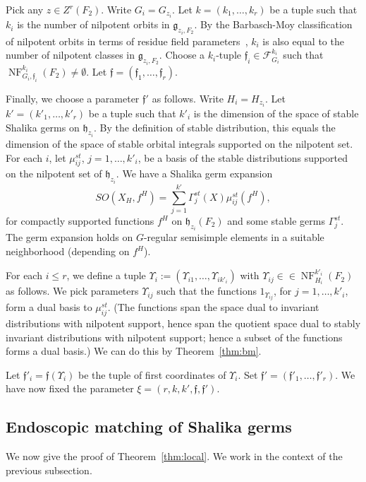 \documentclass[12pt]{amsart}
\newcommand{\op}[1]{\operatorname{#1}}
\def\NF{\op{NF}}
\def\Y{\Upsilon}
\def\s{{\mathfrak{f}}}
\newcommand{\cF}{\mathcal{F}}
\newcommand{\fg}{\mathfrak{g}}
\newcommand{\fh}{\mathfrak{h}}
\theoremstyle{plain}
\theoremstyle{definition}
\begin{document}
Pick any $z\in Z^r(F_2)$.  Write $G_i=G_{z_i}$.  Let
$k=(k_1,\ldots,k_r)$ be a tuple such that $k_i$ is the number of
nilpotent orbits in $\fg_{z_i,F_2}$.  By the Barbasch-Moy
classification of nilpotent orbits in terms of residue field
parameters~\cite{barbasch-moy}, $k_i$ is also equal to the number of
nilpotent classes in $\fg_{z_i,F_2}$.  Choose a $k_i$-tuple $\s_i\in
\cF_{G_i}^{k_i}$ such that $\NF^{k_i}_{G_i,\s_i}(F_2)\ne \emptyset$.
Let $\s = (\s_1,\ldots,\s_r)$.

Finally, we choose a parameter $\s'$ as follows.
Write $H_i = H_{z_i}$.  Let $k'=(k'_1,\ldots,k'_r)$ be a tuple such
that $k'_i$ is the dimension of the space of stable Shalika germs on
$\fh_{z_i}$.  By the definition of stable distribution, this equals
the dimension of the space of stable orbital integrals supported on
the nilpotent set.  For each $i$, let $\mu_{ij}^{st}$, $j =
1,\ldots,k'_i$, be a basis of the stable distributions supported on
the nilpotent set of $\fh_{z_i}$.  We have a Shalika germ expansion
\[
SO(X_H,f^H) = \sum_{j=1}^{k'} \Gamma^{st}_j(X) \mu_{ij}^{st}(f^H),
\]
for compactly supported functions $f^H$ on $\fh_{z_i}(F_2)$ and some
stable germs $\Gamma^{st}_j$.  The germ expansion holds on $G$-regular
semisimple elements in a suitable neighborhood (depending on $f^H$).

For each $i\le r$, we define a tuple $\Y_i :=
(\Y_{i1},\ldots,\Y_{ik'_i})$ with $\Y_{ij}\in \in
\NF^{k'_i}_{H_{i}}(F_2)$ as follows.  We pick
parameters $\Y_{ij}$ such that the functions $1_{\Y_{ij}}$, for
$j=1,\ldots,k'_i$, form a dual basis to $\mu_{ij}^{st}$.  (The
functions span the space dual to invariant distributions with
nilpotent support, hence span the quotient space dual to stably
invariant distributions with nilpotent support; hence a subset of the
functions forms a dual basis.)  We can do this by
Theorem~\ref{thm:bm}.

Let $\s'_i = \s(\Y_i)$ be the tuple of first coordinates of $\Y_i$.
Set $\s' = (\s'_1,\ldots,\s'_r)$.  We have now fixed the parameter
$\xi=(r,k,k',\s,\s')$.
 
\subsection{Endoscopic matching of Shalika germs}\label{sec:emsg}

We now give the proof of Theorem~\ref{thm:local}.  We work in the context
of the previous subsection.
\end{document}
